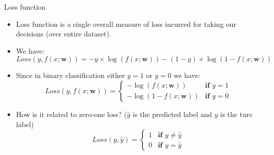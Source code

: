 \documentclass[serif, aspectratio=169]{beamer}
\begin{document}

\begin{frame}{Loss function}
    \begin{itemize}
        \item Loss function is a single overall measure of loss incurred for taking our decisions (over entire dataset).
        \item We have:
        \[ Loss(y, f(x; \mathbf{w})) = -y \times \log (f(x; \mathbf{w})) - (1-y) \times \log 
        (1 - f(x; \mathbf{w}))
        \]
        
        \item Since in binary classification either $y=1$ or $y=0$ we have:
            \[
                Loss(y, f(x; \mathbf{w})) = \begin{cases}
                    - \log (f(x; \mathbf{w})) & \textbf{if } y = 1 \\
                    - \log (1 - f(x; \mathbf{w})) & \textbf{if } y = 0
                \end{cases}
            \]
        \item How is it related to zero-one loss? ($\hat{y}$ is the predicted label and $y$ is the ture label)
           \[
               Loss(y, \hat{y}) =  \begin{cases}
                    1 & \textbf{if } y \neq \hat{y} \\
                    0 & \textbf{if } y = \hat{y}
                \end{cases}
            \]
    \end{itemize}
\end{frame}


\end{document}
